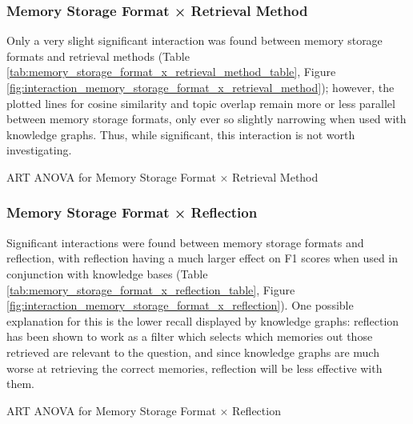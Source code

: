 \subsubsection{Memory Storage Format × Retrieval Method}

Only a very slight significant interaction was found between memory storage formats and retrieval methods (Table \ref{tab:memory_storage_format_x_retrieval_method_table}, Figure \ref{fig:interaction_memory_storage_format_x_retrieval_method}); however, the plotted lines for cosine similarity and topic overlap remain more or less parallel between memory storage formats, only ever so slightly narrowing when used with knowledge graphs. Thus, while significant, this interaction is not worth investigating.

\begin{table}[htbp]
\centering
\tiny

\caption{ART ANOVA for Memory Storage Format × Retrieval Method}
\label{tab:memory_storage_format_x_retrieval_method_table}
\end{table}


\subsubsection{Memory Storage Format × Reflection}

Significant interactions were found between memory storage formats and reflection, with reflection having a much larger effect on F1 scores when used in conjunction with knowledge bases (Table \ref{tab:memory_storage_format_x_reflection_table}, Figure \ref{fig:interaction_memory_storage_format_x_reflection}). One possible explanation for this is the lower recall displayed by knowledge graphs: reflection has been shown to work as a filter which selects which memories out those retrieved are relevant to the question, and since knowledge graphs are much worse at retrieving the correct memories, reflection will be less effective with them.

\begin{table}[htbp]
\centering
\tiny

\caption{ART ANOVA for Memory Storage Format × Reflection}
\label{tab:memory_storage_format_x_reflection_table}
\end{table}


